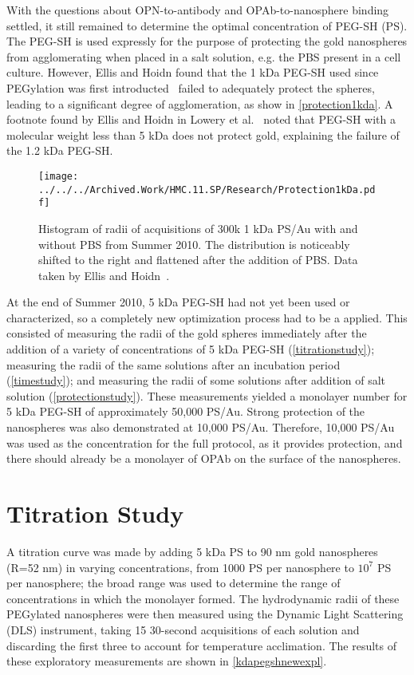 With the questions about OPN-to-antibody and OPAb-to-nanosphere binding settled, it still remained to determine the optimal concentration of PEG-SH (PS). The PEG-SH is used expressly for the purpose of protecting the gold nanospheres from agglomerating when placed in a salt solution, e.g. the PBS present in a cell culture. However, Ellis and Hoidn found that the 1 kDa PEG-SH used since PEGylation was first introducted~\citep{warren} failed to adequately protect the spheres, leading to a significant degree of agglomeration, as show in \autoref{protection1kda}. A footnote found by Ellis and Hoidn in Lowery et al.~\citep{westpegylation} noted that PEG-SH with a molecular weight less than 5 kDa does not protect gold, explaining the failure of the 1.2 kDa PEG-SH.

\begin{figure}[htbp]
\centering
\texttt{[image: ../../../Archived.Work/HMC.11.SP/Research/Protection1kDa.pdf]}
\caption{Histogram of radii of acquisitions of 300k 1 kDa PS\slash Au with and without PBS from Summer 2010. The distribution is noticeably shifted to the right and flattened after the addition of PBS. Data taken by Ellis and Hoidn~\citep{hoidnellis}.}
\label{protection1kda}
\end{figure}



At the end of Summer 2010, 5 kDa PEG-SH had not yet been used or characterized, so a completely new optimization process had to be a applied. This consisted of measuring the radii of the gold spheres immediately after the addition of a variety of concentrations of 5 kDa PEG-SH (\autoref{titrationstudy}); measuring the radii of the same solutions after an incubation period (\autoref{timestudy}); and measuring the radii of some solutions after addition of salt solution (\autoref{protectionstudy}). These measurements yielded a monolayer number for 5 kDa PEG-SH of approximately 50,000 PS\slash Au. Strong protection of the nanospheres was also demonstrated at 10,000 PS\slash Au. Therefore, 10,000 PS\slash Au was used as the concentration for the full protocol, as it provides protection, and there should already be a monolayer of OPAb on the surface of the nanospheres.

\section{Titration Study}
\label{titrationstudy}

A titration curve was made by adding 5 kDa PS to 90 nm gold nanospheres (R=52 nm) in varying concentrations, from 1000 PS per nanosphere to $10^7$ PS per nanosphere; the broad range was used to determine the range of concentrations in which the monolayer formed. The hydrodynamic radii of these PEGylated nanospheres were then measured using the Dynamic Light Scattering (DLS) instrument, taking 15 30-second acquisitions of each solution and discarding the first three to account for temperature acclimation. The results of these exploratory measurements are shown in \autoref{kdapegshnewexpl}.

